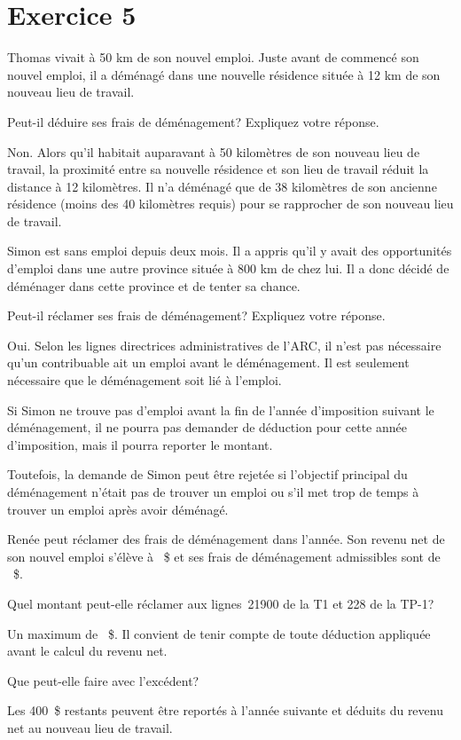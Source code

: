 \section{Exercice 5}
\setcounter{question}{0}
\begin{question}
	Thomas vivait à 50 km de son nouvel emploi. Juste avant de commencé son nouvel emploi, il a déménagé dans une nouvelle résidence située à 12 km de son nouveau lieu de travail.
	
	Peut-il déduire ses frais de déménagement? Expliquez votre réponse.
\end{question}
Non. Alors qu'il habitait auparavant à 50 kilomètres de son nouveau lieu de travail, la proximité entre sa nouvelle résidence et son lieu de travail réduit la distance à 12 kilomètres. Il n'a déménagé que de 38 kilomètres de son ancienne résidence (moins des 40 kilomètres requis) pour se rapprocher de son nouveau lieu de travail.

\begin{question}
	Simon est sans emploi depuis deux mois. Il a appris qu'il y avait des opportunités d'emploi dans une autre province située à 800 km de chez lui. Il a donc décidé de déménager dans cette province et de tenter sa chance.
	
	Peut-il réclamer ses frais de déménagement? Expliquez votre réponse.
\end{question}
Oui. Selon les lignes directrices administratives de l'ARC, il n'est pas nécessaire qu'un contribuable ait un emploi avant le déménagement. Il est seulement nécessaire que le déménagement soit lié à l'emploi.

Si Simon ne trouve pas d'emploi avant la fin de l'année d'imposition suivant le déménagement, il ne pourra pas demander de déduction pour cette année d'imposition, mais il pourra reporter le montant.

Toutefois, la demande de Simon peut être rejetée si l'objectif principal du déménagement n'était pas de trouver un emploi ou s'il met trop de temps à trouver un emploi après avoir déménagé.

\begin{question}
	Renée peut réclamer des frais de déménagement dans l'année. Son revenu net de son nouvel emploi s'élève à ~\$ et ses frais de déménagement admissibles sont de ~\$. 
\end{question}
\setcounter{sousQuestion}{0}
\begin{sousQuestion}
	Quel montant peut-elle réclamer aux lignes~21900 de la T1 et 228 de la TP-1?
\end{sousQuestion}
Un maximum de ~\$. Il convient de tenir compte de toute déduction appliquée avant le calcul du revenu net.
\begin{sousQuestion}
	Que peut-elle faire avec l'excédent?
\end{sousQuestion}
Les 400~\$ restants peuvent être reportés à l'année suivante et déduits du revenu net au nouveau lieu de travail.

